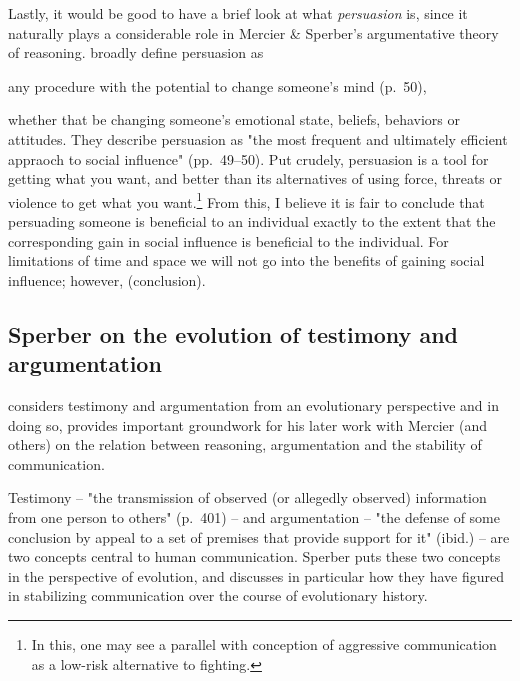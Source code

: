 Lastly, it would be good to have a brief look at what \emph{persuasion} is, since it naturally plays a considerable role in Mercier \& Sperber's argumentative theory of reasoning.
\citet{Brinol09} broadly define persuasion as
\begin{quoting}
    any procedure with the potential to change someone's mind
    \hfill (p.~50),
\end{quoting}
whether that be changing someone's emotional state, beliefs, behaviors or attitudes.
They describe persuasion as "the most frequent and ultimately efficient appraoch to social influence" (pp.~49--50). Put crudely, persuasion is a tool for getting what you want, and better than its alternatives of using force, threats or violence to get what you want.\footnote{In this, one may see a parallel with  conception of aggressive communication as a low-risk alternative to fighting.}
From this, I believe it is fair to conclude that persuading someone is beneficial to an individual exactly to the extent that the corresponding gain in social influence is beneficial to the individual.
For limitations of time and space we will not go into the benefits of gaining social influence; however, (conclusion).

\subsection{Sperber on the evolution of testimony and argumentation}
\label{sec:Sperber01}

\citet{Sperber01} considers testimony and argumentation from an evolutionary perspective and in doing so, provides important groundwork for his later work with Mercier (and others) on the relation between reasoning, argumentation and the stability of communication.

Testimony -- "the transmission of observed (or allegedly observed) information from one person to others" (p.~401) -- and argumentation -- "the defense of some conclusion by appeal to a set of premises that provide support for it" (ibid.) -- are two concepts central to human communication.
Sperber puts these two concepts in the perspective of evolution, and discusses in particular how they have figured in stabilizing communication over the course of evolutionary history.

